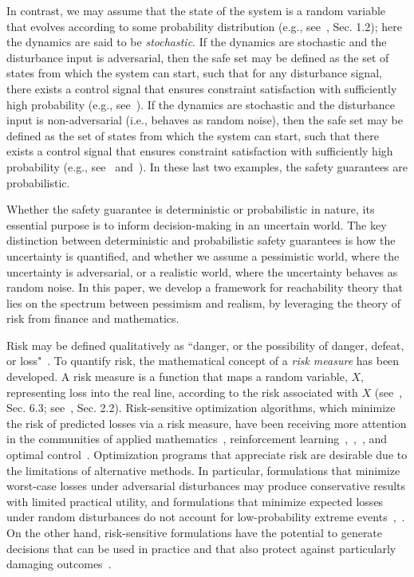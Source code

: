 \documentclass[letterpaper, 10 pt, conference]{ieeeconf}  %
\begin{document}
In contrast, we may assume that the state of the system is a random variable that evolves according to some probability distribution 
(e.g., see~\cite{bertsekas2005dynamic}, Sec. 1.2); here the dynamics are said to be \textit{stochastic}.
If the dynamics are stochastic and the disturbance input is adversarial, 
then the safe set may be defined as the set of states from which the system can start, such that for any disturbance signal,
there exists a control signal that ensures constraint satisfaction with sufficiently high probability (e.g., see~\cite{kamgarpour2011discrete}).
If the dynamics are stochastic and the disturbance input is non-adversarial (i.e., behaves as random noise),
then the safe set may be defined as the set of states from which the system can start, such that there exists a control signal 
that ensures constraint satisfaction with sufficiently high probability (e.g., see~\cite{summers2010verification} and~\cite{abate2008probabilistic}).
In these last two examples, the safety guarantees are probabilistic.

Whether the safety guarantee is deterministic or probabilistic in nature, 
its essential purpose is to inform decision-making in an uncertain world.
The key distinction between deterministic and probabilistic safety guarantees is how the uncertainty is quantified, and 
whether we assume a pessimistic world, where the uncertainty is adversarial, 
or a realistic world, where the uncertainty behaves as random noise.
In this paper, we develop a framework for reachability theory that lies on the spectrum between pessimism and realism,
by leveraging the theory of risk from finance and mathematics. 

Risk may be defined qualitatively as ``danger, or the possibility of danger, defeat, or loss"~\cite{riskdef}.
To quantify risk, the mathematical concept of a \textit{risk measure} has been developed.
A risk measure is a function that maps a random variable, $X$, representing loss into the real line,
according to the risk associated with $X$ (see~\cite{shapiro2009lectures}, Sec. 6.3; see~\cite{kisiala2015conditional}, Sec. 2.2).
Risk-sensitive optimization algorithms, which minimize the risk of predicted losses via a risk measure,
have been receiving more attention in the communities of applied mathematics~\cite{ruszczynski2010risk}, reinforcement learning~\cite{osogami2012robustness},~\cite{chow2015risk},~\cite{ratliff2017risk}, and optimal control~\cite{chow2014framework}.
Optimization programs that appreciate risk are desirable due to the limitations of alternative methods.
In particular, formulations that minimize worst-case losses under adversarial disturbances
may produce conservative results with limited practical utility, and formulations that minimize expected losses under random disturbances do not account for low-probability extreme events~\cite{chow2014framework},~\cite{jha2018safe}. 
On the other hand, risk-sensitive formulations have the potential to generate decisions that can be used in practice and that also protect
against particularly damaging outcomes~\cite{serraino2013conditional}.
\end{document}
